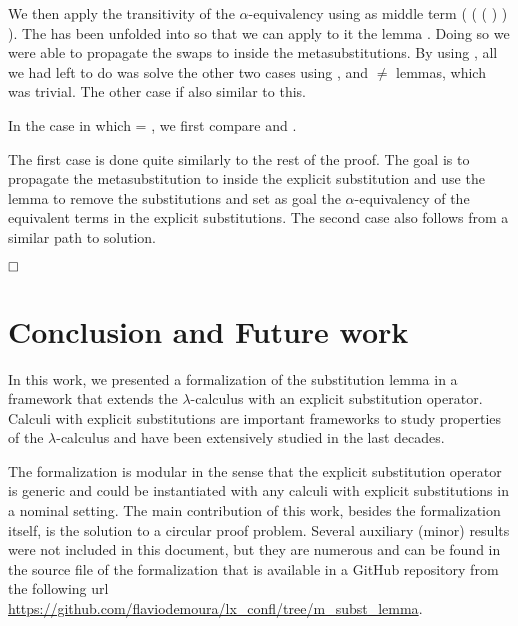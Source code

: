 We then apply the transitivity of the $\alpha$-equivalency using as middle term ( ( (   )  )  ). The  has been unfolded into  so that we can apply to it the lemma . Doing so we were able to propagate the swaps to inside the metasubstitutions. By using , all we had left to do was solve the other two cases using ,  and \ensuremath{\not=} lemmas, which was trivial. The other case if also similar to this.
\begin{coqdoccode}
\end{coqdoccode}
In the case in which  = , we first compare  and . 
\begin{coqdoccode}
\end{coqdoccode}
The first case is done quite similarly to the rest of the proof. The goal is to propagate the metasubstitution to inside the explicit substitution and use the  lemma to remove the substitutions and set as goal the $\alpha$-equivalency of the equivalent terms in the explicit substitutions. The second case also follows from a similar path to solution.
\begin{coqdoccode}
\end{coqdoccode}
$\hfill\Box$ 

\section{Conclusion and Future work}



 In this work, we presented a formalization of the substitution lemma in a framework that extends the $\lambda$-calculus with an explicit substitution operator. Calculi with explicit substitutions are important frameworks to study properties of the $\lambda$-calculus and have been extensively studied in the last decades\cite{abadiExplicitSubstitutions1991,accattoliAbstractFactorizationTheorem2012,ayala-rinconComparingCalculiExplicit2002,ayala-rinconComparingImplementingCalculi2005,bonelliPerpetualityNamedLambda2001,fujitaChurchRosserTheoremCompositional2016}. 


The formalization is modular in the sense that the explicit substitution operator is generic and could be instantiated with any calculi with  explicit substitutions in a nominal setting. The main contribution of this work, besides the formalization itself, is the solution to a circular proof problem. Several auxiliary (minor) results were not included in this document, but they are numerous and can be found in the source file of the formalization that is available in a GitHub repository from the following url \url{https://github.com/flaviodemoura/lx_confl/tree/m_subst_lemma}.


